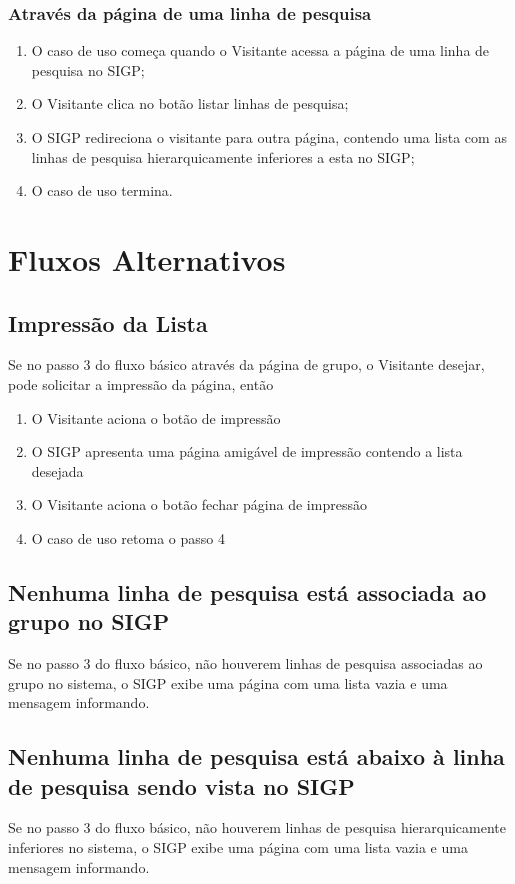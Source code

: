 \documentclass[11pt, a4paper,oneside]{book}
\begin{document}
\subsubsection{Através da página de uma linha de pesquisa}
\begin{enumerate}
\item O caso de uso começa quando o Visitante acessa a página de uma linha de pesquisa no SIGP;
\item O Visitante clica no botão listar linhas de pesquisa;
\item O SIGP redireciona o visitante para outra página, contendo uma lista com as linhas de pesquisa hierarquicamente inferiores a esta no SIGP;
\item O caso de uso termina.
\end{enumerate}

\section{Fluxos Alternativos}

\subsection{Impressão da Lista}
Se no passo $3$ do fluxo básico através da página de grupo, o Visitante desejar, pode solicitar a impressão da página, então

\begin{enumerate}
\item O Visitante aciona o botão de impressão
\item O SIGP apresenta uma página amigável de impressão contendo a lista desejada
\item O Visitante aciona o botão fechar página de impressão
\item O caso de uso retoma o passo 4
\end{enumerate}

\subsection{Nenhuma linha de pesquisa está associada ao grupo no SIGP}
Se no passo $3$ do fluxo básico, não houverem linhas de pesquisa associadas ao grupo no sistema, o SIGP exibe uma página com uma lista vazia e uma mensagem informando.

\subsection{Nenhuma linha de pesquisa está abaixo à linha de pesquisa sendo vista no SIGP}
Se no passo $3$ do fluxo básico, não houverem linhas de pesquisa hierarquicamente inferiores no sistema, o SIGP exibe uma página com uma lista vazia e uma mensagem informando.
\end{document}

